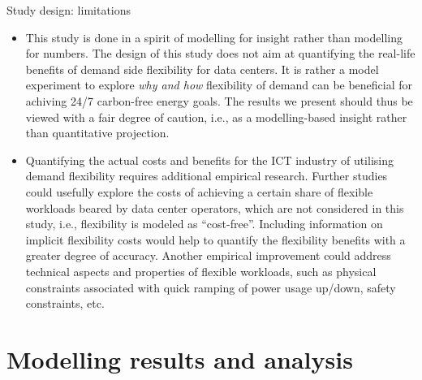 \begin{frame}{Study design: limitations}
  
  {\footnotesize 
  \begin{itemize}

  \item This study is done in a spirit of \alert{modelling for insight} rather than \alert{modelling for numbers}. The design of this study does not aim at quantifying the real-life benefits of demand side flexibility for data centers. It is rather a model experiment to explore \textit{why and how} flexibility of demand can be beneficial for achiving 24/7 carbon-free energy goals. The results we present should thus be viewed with a fair degree of caution, i.e., as a modelling-based insight rather than quantitative projection. 
  
  \item Quantifying the actual costs and benefits for the ICT industry of utilising demand flexibility requires \alert{additional empirical research}. Further studies could usefully explore the costs of achieving a certain share of flexible workloads beared by data center operators, which are \alert{not considered} in this study, i.e., flexibility is modeled as \enquote{cost-free}.  Including information on implicit flexibility costs would help to quantify the flexibility benefits with a greater degree of accuracy. Another empirical improvement could address technical aspects and properties of flexible workloads, such as physical constraints associated with quick ramping of power usage up/down, safety constraints, etc.
  
  \end{itemize}
  }
  \end{frame}


\section{Modelling results and analysis}




